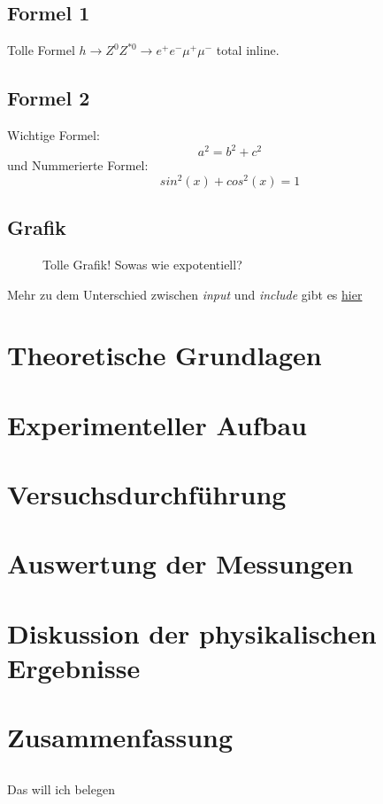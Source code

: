 \documentclass[10pt,a4paper]{article}
\begin{document}
\subsection{Formel 1} Tolle Formel $ h \rightarrow Z^0 Z^{*0} \rightarrow e^+ e^- \mu^+ \mu^- $ total inline.

\subsection{Formel 2} Wichtige Formel:
$$ a^2 = b^2 + c^2 $$
und Nummerierte Formel:
\begin{equation}
sin^2(x)+cos^2(x) = 1
\end{equation}


\subsection{Grafik}
\begin{figure}[h]
\centering
%

\caption[Parabel]{Tolle Grafik! Sowas wie expotentiell?}
\end{figure}
Mehr zu dem Unterschied zwischen \textit{input} und \textit{include} gibt es \href{http://de.wikibooks.org/wiki/LaTeX-W%C3%B6rterbuch:_include}{hier}



\section{Theoretische Grundlagen}
\section{Experimenteller Aufbau}
\section{Versuchsdurchführung}
\section{Auswertung der Messungen}
\section{Diskussion der physikalischen Ergebnisse}


\section{Zusammenfassung}
\subsection{}  Das will ich belegen \cite[p. 2]{erstesBuch}



\newpage





\newpage

\listoffigures %
\end{document}
